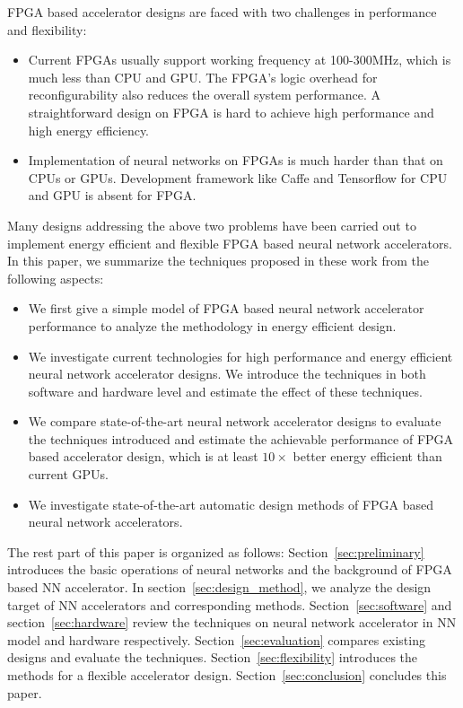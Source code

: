 FPGA based accelerator designs are faced with two challenges in performance and flexibility:
\begin{itemize}
    \item Current FPGAs usually support working frequency at 100-300MHz, which is much less than CPU and GPU. The FPGA's logic overhead for reconfigurability also reduces the overall system performance. A straightforward design on FPGA is hard to achieve high performance and high energy efficiency.
    \item Implementation of neural networks on FPGAs is much harder than that on CPUs or GPUs. Development framework like Caffe and Tensorflow for CPU and GPU is absent for FPGA.
\end{itemize}
 
Many designs addressing the above two problems have been carried out to implement energy efficient and flexible FPGA based neural network accelerators. In this paper, we summarize the techniques proposed in these work from the following aspects:
\begin{itemize}
    \item We first give a simple model of FPGA based neural network accelerator performance to analyze the methodology in energy efficient design.
    \item We investigate current technologies for high performance and energy efficient neural network accelerator designs. We introduce the techniques in both software and hardware level and estimate the effect of these techniques.
    \item We compare state-of-the-art neural network accelerator designs to evaluate the techniques introduced and estimate the achievable performance of FPGA based accelerator design, which is at least $10\times$ better energy efficient than current GPUs.
    \item We investigate state-of-the-art automatic design methods of FPGA based neural network accelerators. 
\end{itemize}

The rest part of this paper is organized as follows: Section~\ref{sec:preliminary} introduces the basic operations of neural networks and the background of FPGA based NN accelerator. In section~\ref{sec:design_method}, we analyze the design target of NN accelerators and corresponding methods. Section~\ref{sec:software} and section~\ref{sec:hardware} review the techniques on neural network accelerator in NN model and hardware respectively. Section~\ref{sec:evaluation} compares existing designs and evaluate the techniques. Section~\ref{sec:flexibility} introduces the methods for a flexible accelerator design. Section~\ref{sec:conclusion} concludes this paper.